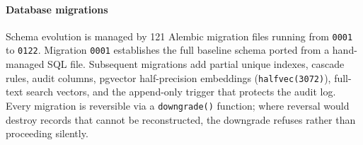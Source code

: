 \paragraph{Database migrations}
Schema evolution is managed by 121 Alembic migration files running from \texttt{0001} to \texttt{0122}. Migration \texttt{0001} establishes the full baseline schema ported from a hand-managed SQL file. Subsequent migrations add partial unique indexes, cascade rules, audit columns, pgvector half-precision embeddings (\texttt{halfvec(3072)}), full-text search vectors, and the append-only trigger that protects the audit log. Every migration is reversible via a \texttt{downgrade()} function; where reversal would destroy records that cannot be reconstructed, the downgrade refuses rather than proceeding silently.
